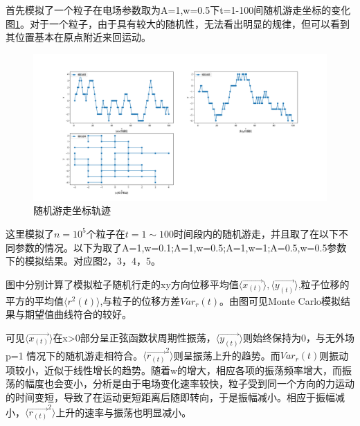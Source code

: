 \documentclass{article}
\begin{document}
	首先模拟了一个粒子在电场参数取为A=1,w=0.5下t=1-100间随机游走坐标的变化图\ref{fig:1}。对于一个粒子，由于具有较大的随机性，无法看出明显的规律，但可以看到其位置基本在原点附近来回运动。
	\begin{figure}[!h]
		
		\centering
		\includegraphics[scale=0.4]{walk}
		\caption{\heiti{}随机游走坐标轨迹}
		\label{fig:1}%
	\end{figure}
	这里模拟了$ n=10^5 $个粒子在$ t=1\sim100 $时间段内的随机游走，并且取了在以下不同参数的情况。以下为取了A=1,w=0.1;A=1,w=0.5;A=1,w=1;A=0.5,w=0.5参数下的模拟结果。对应图2，3，4，5。
	
		
	图中分别计算了模拟粒子随机行走的xy方向位移平均值$ \langle \vec{x_{(t)}}\rangle,\langle \vec{y_{(t)}}\rangle $,粒子位移的平方的平均值$ \langle r^2(t)\rangle $,与粒子的位移方差$ Var_r(t) $。由图可见Monte Carlo模拟结果与期望值曲线符合的较好。
	
	
	可见$ \langle \vec{x_{(t)}}\rangle $在x>0部分呈正弦函数状周期性振荡，$ \langle \vec{y_{(t)}}\rangle $则始终保持为0，与无外场p=1 情况下的随机游走相符合。$ \langle \vec{r_{(t)}}^2\rangle $则呈振荡上升的趋势。而$ Var_r(t) $则振动项较小，近似于线性增长的趋势。随着w的增大，相应各项的振荡频率增大，而振荡的幅度也会变小，分析是由于电场变化速率较快，粒子受到同一个方向的力运动的时间变短，导致了在运动更短距离后随即转向，于是振幅减小。相应于振幅减小，$ \langle \vec{r_{(t)}}^2\rangle $上升的速率与振荡也明显减小。
	
\end{document}
